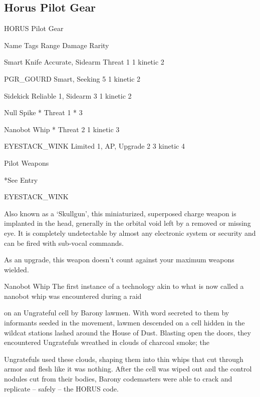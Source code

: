 \subsection{Horus Pilot Gear}

                                          HORUS Pilot Gear  

 Name                   Tags                                   Range           Damage                Rarity 

 Smart Knife            Accurate, Sidearm                     Threat 1         1 kinetic              2 

 PGR\_GOURD              Smart, Seeking                         5               1 kinetic              2 

 Sidekick               Reliable 1, Sidearm                    3               1 kinetic              2 

 Null Spike             *                                     Threat 1        *                       3 

 Nanobot Whip           *                                     Threat 2         1 kinetic              3 

 EYESTACK\_WINK          Limited 1, AP, Upgrade                 2              3 kinetic               4 

                                                Pilot Weapons  

*See Entry
 

EYESTACK\_WINK  

Also known as a ‘Skullgun’, this miniaturized, superposed charge weapon is implanted in the head,  
generally in the orbital void left by a removed or missing eye. It is completely undetectable by almost any  
electronic system or security and can be fired with sub-vocal commands.   

As an upgrade, this weapon doesn’t count against your maximum weapons wielded.
 

Nanobot Whip  
The first instance of a technology akin to what is now called a nanobot whip was encountered during a raid  

on an Ungrateful cell by Barony lawmen. With word secreted to them by informants seeded in the  
movement, lawmen descended on a cell hidden in the wildcat stations lashed around the House of Dust.  
Blasting open the doors, they encountered Ungratefuls wreathed in clouds of charcoal smoke; the  

Ungratefuls used these clouds, shaping them into thin whips that cut through armor and flesh like it was  
nothing. After the cell was wiped out and the control nodules cut from their bodies, Barony codemasters  
were able to crack and replicate -- safely -- the HORUS code.   

